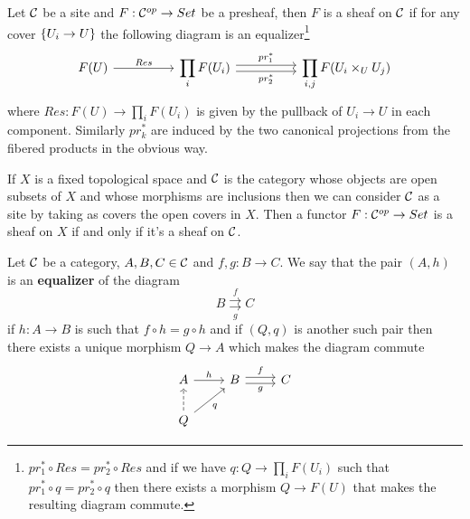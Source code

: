 {\begin{definition}
Let $\mathcal{C}$ be a site and $F:\mathcal{C}^{op}\to Set$ be a presheaf, then $F$ is a sheaf on $\mathcal{C}$ if for any cover $\left\{{U_i\to U}\right\}$ the following diagram is an equalizer\footnote{$pr_1^\ast\circ Res=pr_2^\ast\circ Res$ and if we have $q:Q\to \prod_i F(U_i)$ such that $pr_1^\ast\circ q=pr_2^\ast\circ q$ then there exists a morphism $Q\to F(U)$ that makes the resulting diagram commute.}
\[\begin{tikzcd}
	{F(U)} && {\displaystyle \prod_iF(U_i)} && {\displaystyle \prod_{i,j}F(U_i\times_UU_j)}
	\arrow["Res", from=1-1, to=1-3]
	\arrow["{pr_1^\ast}", shift left, from=1-3, to=1-5]
	\arrow["{pr_2^\ast}"', shift right, from=1-3, to=1-5]
\end{tikzcd}\]
where $Res:F(U)\to \prod_i F(U_i)$ is given by the pullback of $U_i\to U$ in each component. Similarly $pr_k^\ast$ are induced by the two canonical projections from the fibered products in the obvious way.
\end{definition}
\begin{remark}
If $X$ is a fixed topological space and $\mathcal{C}$ is the category whose objects are open subsets of $X$ and whose morphisms are inclusions then we can consider $\mathcal{C}$ as a site by taking as covers the open covers in $X$. Then a functor $F:\mathcal{C}^{op}\to Set$ is a sheaf on $X$ if and only if it's a sheaf on $\mathcal{C}$.
\end{remark}}








\begin{definition}[Equalizer]
Let $\mathcal{C}$ be a category, $A,B,C\in \mathcal{C}$ and $f,g:B\to C$. We say that the pair $(A,h)$ is an \textbf{equalizer} of the diagram \[B\underset{g}{\overset{f}{\rightrightarrows}} C\]
if $h:A\to B$ is such that $f\circ h=g\circ h$ and if $(Q,q)$ is another such pair then there exists a unique morphism $Q\to A$ which makes the diagram commute
\[\begin{tikzcd}
	A & B & C \\
	Q
	\arrow["h", from=1-1, to=1-2]
	\arrow["f", shift left, from=1-2, to=1-3]
	\arrow["g"', shift right, from=1-2, to=1-3]
	\arrow["q"', from=2-1, to=1-2]
	\arrow[dashed, from=2-1, to=1-1]
\end{tikzcd}\]
\end{definition}


